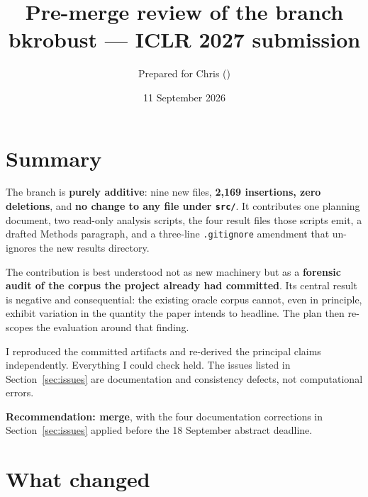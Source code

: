 \documentclass[11pt,a4paper]{article}
\title{\vspace{-1.5em}\textbf{Pre-merge review of the \code{iclr2027-eval-plan} branch}\\
\large bkrobust --- ICLR 2027 submission}
\author{Prepared for Chris (\code{chrisahn99@gmail.com})}
\date{11 September 2026}
\newcommand{\code}[1]{\texttt{\small\hspace{0pt}#1}}
\begin{document}
\maketitle
\thispagestyle{fancy}

\section{Summary}

The branch is \textbf{purely additive}: nine new files, \textbf{2{,}169 insertions, zero
deletions}, and \textbf{no change to any file under \code{src/}}. It contributes one planning
document, two read-only analysis scripts, the four result files those scripts emit, a drafted
Methods paragraph, and a three-line \code{.gitignore} amendment that un-ignores the new results
directory.

The contribution is best understood not as new machinery but as a \textbf{forensic audit of the
corpus the project already had committed}. Its central result is negative and consequential: the
existing oracle corpus cannot, even in principle, exhibit variation in the quantity the paper
intends to headline. The plan then re-scopes the evaluation around that finding.

I reproduced the committed artifacts and re-derived the principal claims independently. Everything
I could check held. The issues listed in Section~\ref{sec:issues} are documentation and
consistency defects, not computational errors.

\medskip
\textbf{Recommendation: merge}, with the four documentation corrections in
Section~\ref{sec:issues} applied before the 18 September abstract deadline.

\section{What changed}
\end{document}
